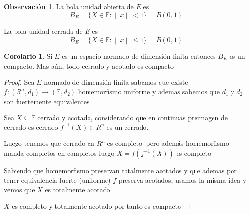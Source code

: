 \documentclass[12pt]{article}
\newcommand{\E}{\mathbb{E}}
\newcommand{\ra}{\rightarrow}
\newcommand{\ol}{\overline}
\newcommand{\norm}[1]{\left\lVert#1\right\rVert}
\theoremstyle{definition}
\newtheorem*{remark}{Observación}
\newtheorem{corollary}{Corolario}[theorem]
\begin{document}
\begin{remark}
	La bola unidad abierta de $E$ es $$ B_{E} = \{X \in \E: \norm{x} < 1\}=B(0,1)$$

	La bola unidad cerrada de $E$ es $$ \ol B_{E} = \{X \in \E: \norm{x} \leq 1\}=\ol B(0,1)$$

\end{remark}
\begin{corollary}
	Si $E$ es un espacio normado de dimensión finita entonces $\ol B_{E}$ es un compacto.  Mas aún, todo cerrado y acotado es compacto
	\begin{proof}
	  Sea $E$ normado de dimensión finita sabemos que existe $f:(R^{n},d_{1}) \ra (\E,d_{2})$ homemorfismo uniforme y ademas sabemos que $d_{1}$ y $d_{2}$ son fuertemente equivalentes


		Sea $X \subseteq \E$ cerrado y acotado, considerando que en continuas preimagen de cerrado es cerrado $f^{-1}(X) \in R^n$ es un cerrado. 

		Luego tenemos que cerrado en $R^n$ es completo, pero además homemorfismo manda completos en completos luego $X = f(f^{-1}(X))$ es completo

		Sabiendo que homemorfismo preservan totalmente acotados y que ademas por tener equivalencia fuerte (uniforme) $f$ preserva acotados, usamos la misma idea y vemos que $X$ es totalmente acotado 

		$X$ es completo y totalmente acotado por tanto es compacto

	\end{proof}

\end{corollary}
\end{document}
